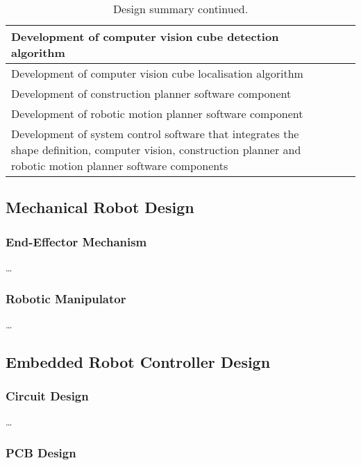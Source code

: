\begin{table}[ht]
	\renewcommand{\arraystretch}{1.3}
	\centering
	\begin{tabular}{|>{\raggedright}m{5cm}|>{\raggedright}m{5cm}|>{\raggedright\arraybackslash}m{5cm}|}
		\hline
		Development of computer vision cube detection algorithm & & \\
		\hline
		Development of computer vision cube localisation algorithm & & \\
		\hline
		Development of construction planner software component & & \\
		\hline
		Development of robotic motion planner software component & & \\
		\hline
		Development of system control software that integrates the shape definition, computer vision, construction planner and robotic motion planner software components & & \\
		\hline
	\end{tabular}
	\caption{\label{tab:design_summary_p2}Design summary continued.}
\end{table}

\subsection{Mechanical Robot Design}

\subsubsection{End-Effector Mechanism}

\ldots

\subsubsection{Robotic Manipulator}

\ldots

\subsection{Embedded Robot Controller Design}

\subsubsection{Circuit Design}

\ldots

\subsubsection{PCB Design}

